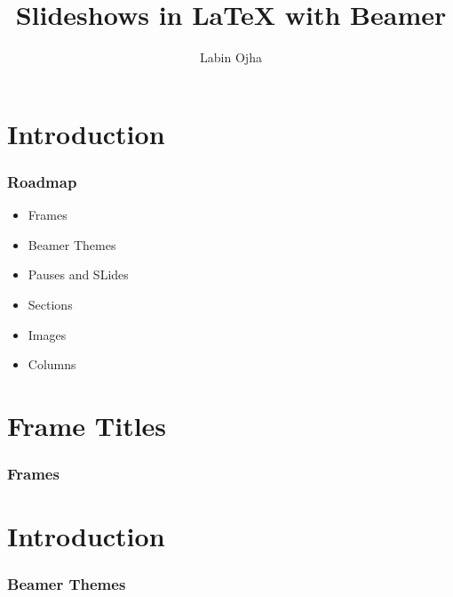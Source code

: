 \documentclass{beamer}
\author{Labin Ojha}
\title{Slideshows in {\LaTeX} with Beamer}
\begin{document}
\maketitle

\section{Introduction}
\begin{frame}
    \frametitle{Roadmap}

    \begin{itemize}
        \item Frames \pause
        \item Beamer Themes \pause
        \item Pauses and SLides \pause
        \item Sections \pause
        \item Images \pause
        \item Columns
    \end{itemize}
\end{frame}

\section{Frame Titles}
\begin{frame}
    \frametitle{Frames}
\end{frame}

\section{Introduction}
\begin{frame}
    \frametitle{Beamer Themes}
\end{frame}
\end{document}
